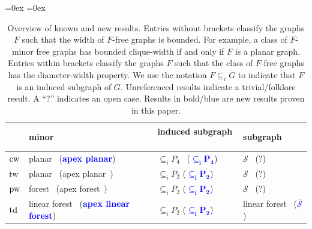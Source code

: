 \documentclass[runningheads,envcountsame]{llncs}
\newcommand{\td}{{\textup{td}}}
\newcommand{\tw}{{\textup{tw}}}
\newcommand{\cw}{{\textup{cw}}}
\newcommand{\pw}{{\textup{pw}}}
\begin{document}
\begin{table}[t]
\begin{center}
 \aboverulesep=0ex
 \belowrulesep=0ex
\begin{tabular}{l|l|l|l}
\toprule
& \hspace*{17.5mm}minor & induced subgraph$\;\;\;$ & \hspace*{6.5mm} subgraph \\\midrule
$\cw$ &   planar~\cite{DP16} \hspace*{7mm} (\textcolor{blue}{\bf apex planar})            &  $\subseteq_i P_4$~\cite{CO00} (\textcolor{blue}{\bf $\mathbf{\subseteq_i P_4}$}) & $\mathcal{S}$~\cite{BL02} \hspace*{15.5mm}
(?)\\
$\tw$ &       planar~\cite{RS86} \hspace*{8mm}(apex planar~\cite{Ep00})           &  $\subseteq_i P_2$ \hspace*{3.5mm} (\textcolor{blue}{\bf $\mathbf{\subseteq_i P_2}$}) & $\mathcal{S}$~\cite{RS84} 
\hspace*{14mm}
(?)\\
$\pw$ &       forest~\cite{BRST91} 
 \hspace*{11mm}(apex forest~\cite{DEJMW20})                   &  $\subseteq_i P_2$  
 \hspace*{3.5mm}
 (\textcolor{blue}{\bf $\mathbf{\subseteq_i P_2}$}) & $\mathcal{S}$~\cite{RS84}
 \hspace*{14mm}
 (?)\\
$\td$ &  linear forest~\cite{NM12} (\textcolor{blue}{\bf apex linear forest})    
& $\subseteq_i P_2$ \hspace*{3.5mm} (\textcolor{blue}{\bf $\mathbf{\subseteq_i P_2}$}) &  linear forest~\cite{NM12} (\textcolor{blue}{$\mathbf{\overline{{\mathcal S}}}$})\\\bottomrule
\end{tabular}
\end{center}
\caption{Overview of known and new results. Entries without brackets classify the graphs $F$ such that the width of $F$-free graphs is bounded. For example, a class of $F$-minor free graphs has bounded clique-width if and only if $F$ is a planar graph. Entries within brackets classify the graphs $F$ such that the class of $F$-free graphs has the diameter-width property.  We use the notation $F \subseteq_i G$ to indicate that $F$ is an induced subgraph of $G$. Unreferenced results indicate a trivial/folklore result. A ``?'' indicates an open case. Results in bold/blue are new results proven in this paper.}\label{t-table}
\vspace*{-0.5cm}
\end{table}
\end{document}
